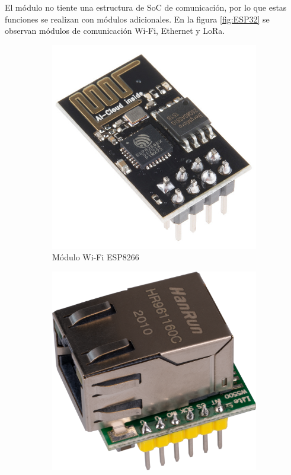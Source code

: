 El módulo no tiente una estructura de SoC de comunicación, por lo que estas funciones se realizan con módulos adicionales.
En la figura \ref{fig:ESP32} se observan módulos de comunicación Wi-Fi, Ethernet y LoRa.
\begin{figure}[h!]
\centering
\begin{subfigure}[b]{0.2\linewidth}
	\includegraphics[width=\linewidth]{./Figures/ESP8266.jpg}
	\caption{Módulo Wi-Fi ESP8266}
	\label{fig:ESP8266}
\end{subfigure}\hspace{15mm}
\begin{subfigure}[b]{0.2\linewidth}
	\includegraphics[width=\linewidth]{./Figures/w5500.png}

\end{subfigure}
\end{figure}
